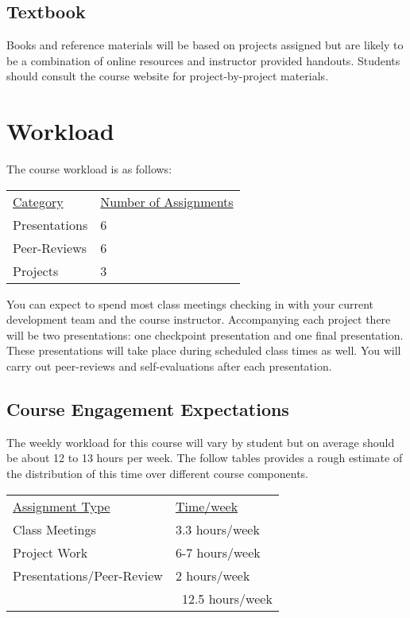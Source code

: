 \documentclass[10pt]{article}
\begin{document}
\subsection{Textbook}

Books and reference materials will be based on projects assigned but are likely to be a combination of online resources and instructor provided handouts.  Students should consult the course website for project-by-project materials.

\section{Workload}

The course workload is as follows:
\begin{center}
  \begin{tabular}{ll}
    \underline{Category} & \underline{Number of Assignments} \\
    Presentations & 6 \\
    Peer-Reviews & 6 \\
    Projects & 3 \\
  \end{tabular}
\end{center}

You can expect to spend most class meetings checking in with your current development team and the course instructor. Accompanying each project there will be two presentations: one checkpoint presentation and one final presentation. These presentations will take place during scheduled class times as well. You will carry out peer-reviews and self-evaluations after each presentation.

\subsection{Course Engagement Expectations}

The weekly workload for this course will vary by student but on average should be about 12 to 13 hours per week.  The follow tables provides a rough estimate of the distribution of this time over different course components.
\begin{center}
\begin{tabular}{ll}
\underline{Assignment Type} & \underline{Time/week} \\
Class Meetings       & 3.3 hours/week \\
Project Work          & 6-7 hours/week \\
Presentations/Peer-Review   & 2 hours/week \\
\bottomrule
 & ~12.5 hours/week
\end{tabular}
\end{center}
\end{document}
